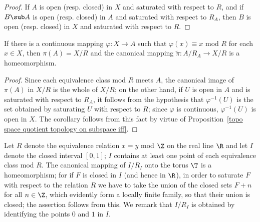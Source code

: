 \begin{proof}
If $A$ is open (resp. closed) in $X$ and saturated with respect to $R$, and if $B\sub A$ is open (resp. closed) in $A$ and saturated with respect to $R_A$, then $B$ is open (resp. closed) in $X$ and saturated with respect to $R$.
\end{proof}
\begin{corollary}\label{topo space quotient map on sectioned orbit subspace}
If there is a continuous mapping $\varphi:X\to A$ such that $\varphi(x)\equiv x$ mod $R$ for each $x\in X$, then $\pi(A)=X/R$ and the canonical mapping $\tilde{\pi}:A/R_A\to X/R$ is a homeomorphism.
\end{corollary}
\begin{proof}
Since each equivalence class mod $R$ meets $A$, the canonical image of $\pi(A)$ in $X/R$ is the whole of $X/R$; on the other hand, if $U$ is open in $A$ and is saturated with respect to $R_A$, it follows from the hypothesis that $\varphi^{-1}(U)$ is the set obtained by saturating $U$ with respect to $R$; since $\varphi$ is continuous, $\varphi^{-1}(U)$ is open in $X$. The corollary follows from this fact by virtue of Proposition~\ref{topo space quotient topology on subspace iff}.
\end{proof}
\begin{example}
Let $R$ denote the equivalence relation $x=y$ mod $\Z$ on the real line $\R$ and let $I$ denote the closed interval $[0,1]$; $I$ contains at least one point of each equivalence class mod $R$. The canonical mapping of $I/R_I$ onto the torus $\T$ is a homeomorphism; for if $F$ is closed in $I$ (and hence in $\R$), in order to saturate $F$ with respect to the relation $R$ we have to take the union of the closed sets $F+n$ for all $n\in\Z$, which evidently form a locally finite family, so that their union is closed; the assertion follows from this. We remark that $I/R_I$ is obtained by identifying the points $0$ and $1$ in $I$.
\end{example}
